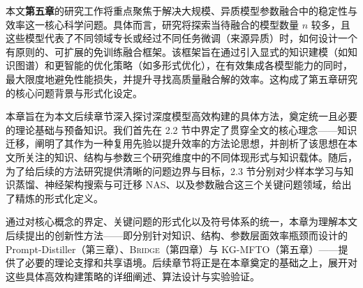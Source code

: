 \documentclass[../main.tex]{subfiles}
\begin{document}
本文\textbf{第五章}的研究工作将重点聚焦于解决大规模、异质模型参数融合中的稳定性与效率这一核心科学问题。具体而言，研究将探索当待融合的模型数量 $n$ 较多，且这些模型代表了不同领域专长或经过不同任务微调（来源异质）时，如何设计一个有原则的、可扩展的免训练融合框架。该框架旨在通过引入显式的知识建模（如知识图谱）和更智能的优化策略（如多形式优化），在有效集成各模型能力的同时，最大限度地避免性能损失，并提升寻找高质量融合解的效率。这构成了第五章研究的核心问题背景与形式化设定。


本章旨在为本文后续章节深入探讨深度模型高效构建的具体方法，奠定统一且必要的理论基础与预备知识。我们首先在 2.2 节中界定了贯穿全文的核心理念——知识迁移，阐明了其作为一种复用先验以提升效率的方法论思想，并剖析了该思想在本文所关注的知识、结构与参数三个研究维度中的不同体现形式与知识载体。随后，为了给后续的方法研究提供清晰的问题边界与目标，2.3 节分别对少样本学习与知识蒸馏、神经架构搜索与可迁移 NAS、以及参数融合这三个关键问题领域，给出了精炼的形式化定义。

通过对核心概念的界定、关键问题的形式化以及符号体系的统一，本章为理解本文后续提出的创新性方法——即分别针对知识、结构、参数层面效率瓶颈而设计的 Prompt-Distiller（第三章）、\textsc{Bridge}（第四章）与 KG-MFTO（第五章）——提供了必要的理论支撑和共享语境。后续章节将正是在本章奠定的基础之上，展开对这些具体高效构建策略的详细阐述、算法设计与实验验证。
\end{document}
